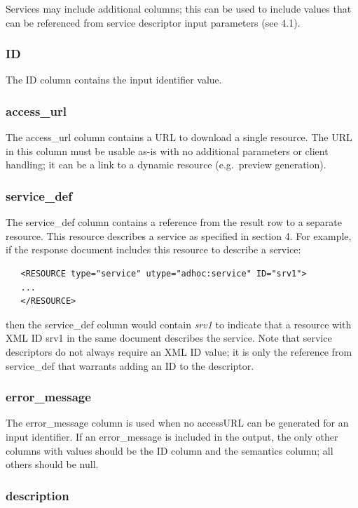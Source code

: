 \documentclass[11pt,a4paper]{ivoa}
\begin{document}
Services may include additional columns; this can be used to include
values that can be referenced from service descriptor input parameters
(see 4.1).


\subsubsection{ID}

The ID column contains the input identifier value.


\subsubsection{access\_url}

The access\_url column contains a URL to download a single resource.
The URL in this column must be usable as-is with no additional
parameters or client handling; it can be a link to a dynamic
resource (e.g.\ preview generation).


\subsubsection{service\_def}

The service\_def column contains a reference from the result row to
a separate resource. This resource describes a service as specified
in section 4.
For example, if the response document includes this resource
to describe a service:
\begin{verbatim}
   <RESOURCE type="service" utype="adhoc:service" ID="srv1">
   ...
   </RESOURCE>
\end{verbatim}
then the service\_def column would contain {\em srv1\/} to indicate that
a resource with XML ID srv1 in the same document describes the service.
Note that service descriptors do not always require an XML ID value;
it is only the reference from service\_def that warrants adding
an ID to the descriptor.


\subsubsection{error\_message}

The error\_message column is used when no accessURL can be generated for
an input identifier. If an error\_message is included in the output, the
only other columns with values should be the ID column and the semantics
column; all others should be null.


\subsubsection{description}
\end{document}
